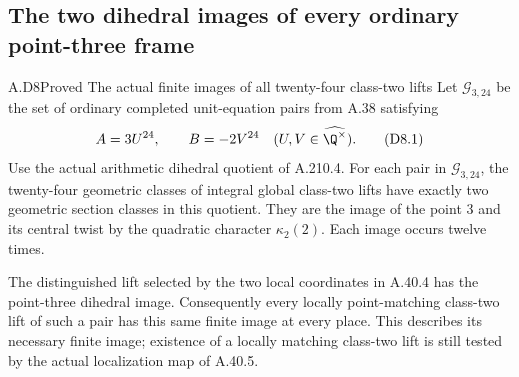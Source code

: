 \subsection{The two dihedral images of every ordinary point-three frame}

\begin{statement}{A.D8}{Proved}
{The actual finite images of all twenty-four class-two lifts}
Let \(\mathcal G_{3,24}\) be the set of ordinary completed
unit-equation pairs from A.38 satisfying
\[
                A=3U^{24},\qquad B=-2V^{24}
                \quad(U,V\in\widehat{\Q^\times}).
\tag{D8.1}
\]
Use the actual arithmetic dihedral quotient of A.210.4.
For each pair in \(\mathcal G_{3,24}\), the twenty-four
geometric classes of integral global class-two lifts have
exactly two geometric section classes in this quotient.
They are the image of the point \(3\) and its central
twist by the quadratic character \(\kappa_2(2)\).
Each image occurs twelve times.

The distinguished lift selected by the two local coordinates
in A.40.4 has the point-three dihedral image.  Consequently
every locally point-matching class-two lift of such a pair
has this same finite image at every place.  This describes
its necessary finite image; existence of a locally matching
class-two lift is still tested by the actual localization
map of A.40.5.
\end{statement}

